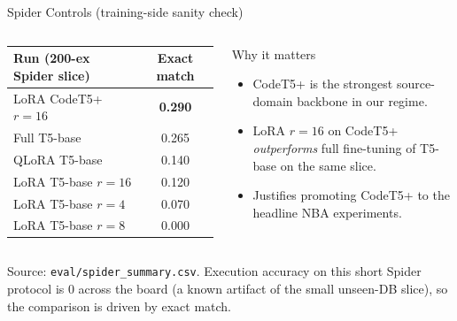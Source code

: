 \documentclass[aspectratio=169,11pt]{beamer}
\begin{document}
\begin{frame}{Spider Controls (training-side sanity check)}
  \begin{columns}[T,onlytextwidth]
      \centering\small
      \begin{tabular}{lc}
        \toprule
        \textbf{Run} (200-ex Spider slice) & \textbf{Exact match} \\
        \midrule
        LoRA CodeT5+ $r{=}16$              & \textbf{0.290} \\
        Full T5-base                       & 0.265 \\
        QLoRA T5-base                      & 0.140 \\
        LoRA T5-base $r{=}16$              & 0.120 \\
        LoRA T5-base $r{=}4$               & 0.070 \\
        LoRA T5-base $r{=}8$               & 0.000 \\
        \bottomrule
      \end{tabular}
      \begin{block}{Why it matters}
        \begin{itemize}
          \item CodeT5+ is the strongest source-domain backbone in our regime.
          \item LoRA $r{=}16$ on CodeT5+ \emph{outperforms} full fine-tuning
                of T5-base on the same slice.
          \item Justifies promoting CodeT5+ to the headline NBA experiments.
        \end{itemize}
      \end{block}
  \end{columns}

  \vspace{4pt}
  {\footnotesize Source: \texttt{eval/spider\_summary.csv}. Execution accuracy on this
  short Spider protocol is 0 across the board (a known artifact of the small
  unseen-DB slice), so the comparison is driven by exact match.}
\end{frame}
\end{document}
